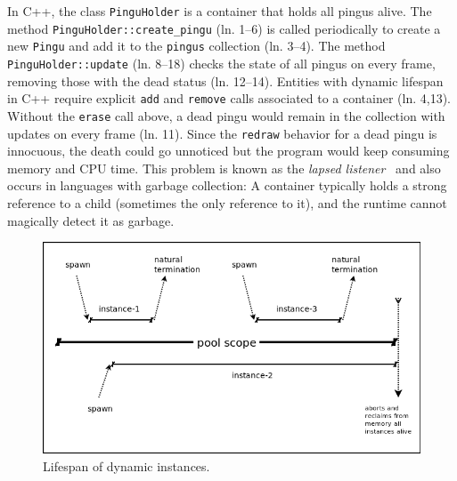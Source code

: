 \documentclass{vgtc}                          %
\newcommand{\code}[1] {{\small{\texttt{#1}}}}
\begin{document}
In C++, the class \code{PinguHolder} is a container that holds all pingus
alive.
%
The method \code{PinguHolder::create\_pingu} (ln. 1--6) is called periodically
to create a new \code{Pingu} and add it to the \code{pingus} collection
(ln. 3--4).
The method \code{PinguHolder::update} (ln. 8--18) checks the state of all
pingus on every frame, removing those with the dead status (ln. 12--14).
%
Entities with dynamic lifespan in C++ require explicit \code{add} and
\code{remove} calls associated to a container (ln. 4,13).
Without the \code{erase} call above, a dead pingu would remain in the
collection with updates on every frame (ln. 11).
Since the \code{redraw} behavior for a dead pingu is innocuous, the death could
go unnoticed but the program would keep consuming memory and CPU time.
This problem is known as the \emph{lapsed listener}~\cite{games.patterns} and
also occurs in languages with garbage collection:
A container typically holds a strong reference to a child (sometimes the only 
reference to it), and the runtime cannot magically detect it as garbage.

\begin{figure}[t]
\centering
\includegraphics[width=\columnwidth]{pool}
\caption{Lifespan of dynamic instances.
\label{fig.pool}
}
\end{figure}
\end{document}

